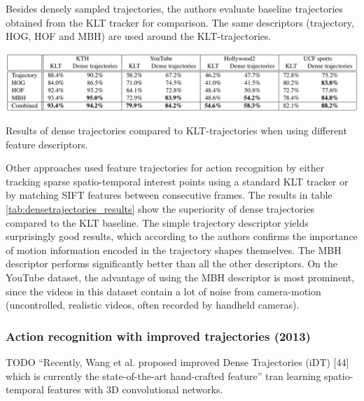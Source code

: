 Besides densely sampled trajectories, the authors evaluate baseline trajectories obtained from the KLT tracker for comparison.
The same descriptors (trajectory, HOG, HOF and MBH) are used around the KLT-trajectories.

\begin{table}[H]
    \centering
    \includegraphics[width=\textwidth]{img_conventional/densetrajectories_results}
    \caption{Results of dense trajectories compared to KLT-trajectories when using different feature descriptors. \cite{wang_action_2011}}
    \label{tab:densetrajectories_results}
\end{table}

Other approaches used feature trajectories for action recognition by either tracking sparse spatio-temporal interest points using a standard KLT tracker \cite{lucas_iterative_1981} or by matching SIFT features \cite{lowe_distinctive_2004} between consecutive frames.
The results in table \ref{tab:densetrajectories_results} show the superiority of dense trajectories compared to the KLT baseline.
The simple trajectory descriptor yields surprisingly good results, which according to the authors confirms the importance of motion information encoded in the trajectory shapes themselves.
The MBH descriptor performs significantly better than all the other descriptors.
On the YouTube dataset, the advantage of using the MBH descriptor is most prominent, since the videos in this dataset contain a lot of noise from camera-motion (uncontrolled, realistic videos, often recorded by handheld cameras).


\subsubsection{Action recognition with improved trajectories (2013)}
TODO
\cite{wang_action_2013}
``Recently, Wang et al. proposed improved Dense Trajectories (iDT) [44] which is currently the state-of-the-art hand-crafted feature'' tran learning spatio-temporal features with 3D convolutional networks.
